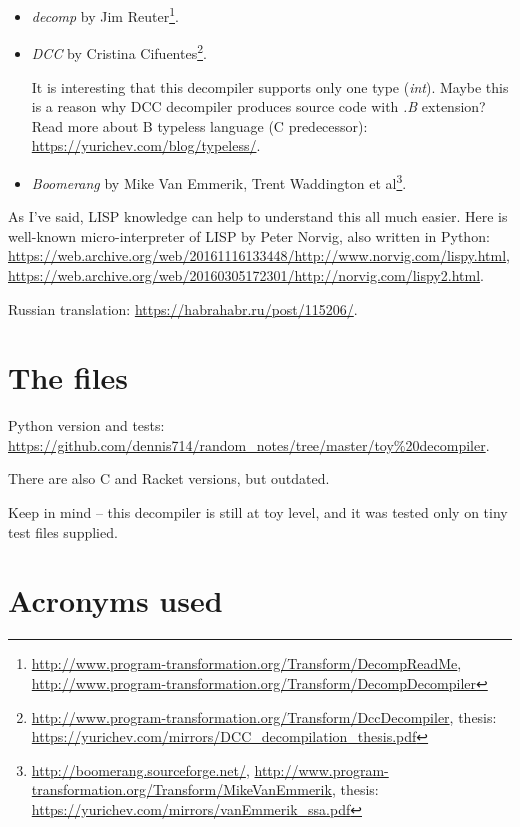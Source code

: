 ﻿\documentclass[12pt]{article}
\begin{document}
\begin{itemize}
	\item \textit{decomp} by Jim Reuter\footnote{
			\url{http://www.program-transformation.org/Transform/DecompReadMe},
			\url{http://www.program-transformation.org/Transform/DecompDecompiler}}.

	\item \textit{DCC} by Cristina Cifuentes\footnote{
			\url{http://www.program-transformation.org/Transform/DccDecompiler},
			thesis: \url{https://yurichev.com/mirrors/DCC_decompilation_thesis.pdf}}.

		It is interesting that this decompiler supports only one type (\textit{int}).
		Maybe this is a reason why DCC decompiler produces source code with \textit{.B} extension?
		Read more about B typeless language (C predecessor): \url{https://yurichev.com/blog/typeless/}.

	\item \textit{Boomerang} by Mike Van Emmerik, Trent Waddington et al\footnote{
			\url{http://boomerang.sourceforge.net/},
			\url{http://www.program-transformation.org/Transform/MikeVanEmmerik},
			thesis: \url{https://yurichev.com/mirrors/vanEmmerik_ssa.pdf}}.
\end{itemize}

As I've said, LISP knowledge can help to understand this all much easier.
Here is well-known micro-interpreter of LISP by Peter Norvig, also written in Python:
\url{https://web.archive.org/web/20161116133448/http://www.norvig.com/lispy.html},
\url{https://web.archive.org/web/20160305172301/http://norvig.com/lispy2.html}.

Russian translation: \url{https://habrahabr.ru/post/115206/}.

\section{The files}

Python version and tests:
\url{https://github.com/dennis714/random_notes/tree/master/toy\%20decompiler}.

There are also C and Racket versions, but outdated.

Keep in mind -- this decompiler is still at toy level, and it was tested only on tiny test files supplied.

\section{Acronyms used}

\begin{acronym}
\end{acronym}
\end{document}
